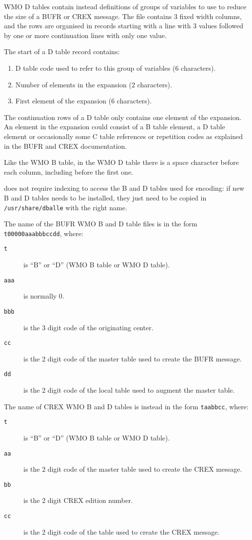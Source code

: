 WMO D tables contain instead definitions of groups of variables to use to
reduce the size of a BUFR or CREX message.  The file contains 3 fixed width
columns, and the rows are organised in records starting with a line with 3
values followed by one or more continuation lines with only one value.

The start of a D table record contains:

\begin{enumerate}
\item D table code used to refer to this group of variables (6 characters).
\item Number of elements in the expansion (2 characters).
\item First element of the expansion (6 characters).
\end{enumerate}

The continuation rows of a D table only contains one element of the expansion.
An element in the expansion could consist of a B table element, a D table
element or occasionally some C table references or repetition codes as
explained in the BUFR and CREX documentation.

Like the WMO B table, in the WMO D table there is a space character before each
column, including before the first one.

\dballe{} does not require indexing to access the B and D tables used for
encoding: if new B and D tables needs to be installed, they just need to be
copied in {\tt /usr/share/dballe} with the right name.

The name of the BUFR WMO B and D table files is in the form
{\tt t00000aaabbbccdd}, where:

\begin{description}
\item[{\tt t}] is ``B'' or ``D'' (WMO B table or WMO D table).
\item[{\tt aaa}] is normally 0.
\item[{\tt bbb}] is the 3 digit code of the originating center.
\item[{\tt cc}] is the 2 digit code of the master table used to create the BUFR
                message.
\item[{\tt dd}] is the 2 digit code of the local table used to augment the
                master table.
\end{description}

The name of CREX WMO B and D tables is instead in the form {\tt taabbcc}, where:

\begin{description}
\item[{\tt t}] is ``B'' or ``D'' (WMO B table or WMO D table).
\item[{\tt aa}] is the 2 digit code of the master table used to create the CREX
                message.
\item[{\tt bb}] is the 2 digit CREX edition number.
\item[{\tt cc}] is the 2 digit code of the table used to create the CREX
                message.
\end{description}
